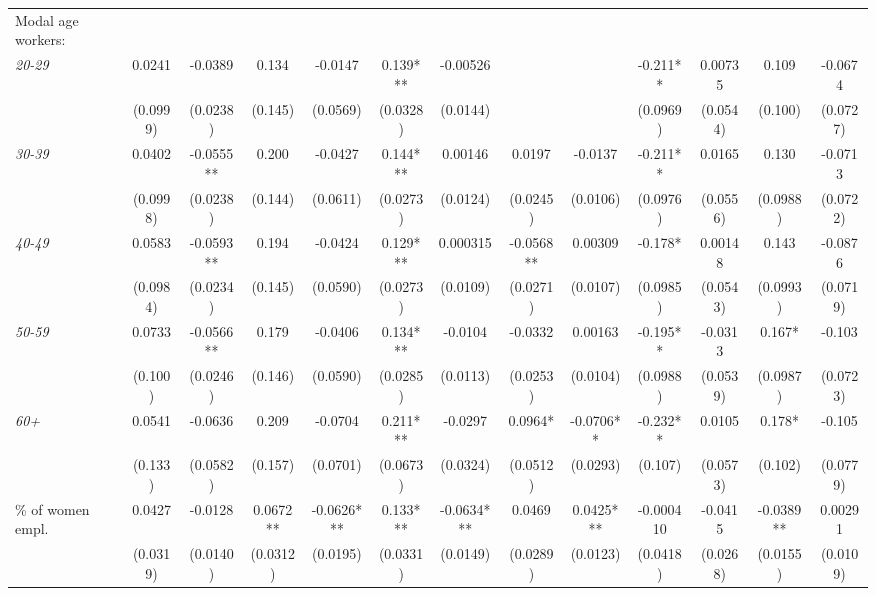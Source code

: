 \begin{threeparttable}
\begin{tabular}{l*{12}{S}}
Modal age workers:        \\[1ex]
\quad \textit{20-29}      &  0.0241    & -0.0389     & 0.134      & -0.0147    & 0.139***  & -0.00526   &            &            & -0.211**  & 0.00735   & 0.109       & -0.0674    \\
                          &  (0.0999)  & (0.0238)    & (0.145)    & (0.0569)   & (0.0328)  & (0.0144)   &            &            & (0.0969)  & (0.0544)  & (0.100)     & (0.0727)   \\[1ex]
\quad \textit{30-39}      &  0.0402    & -0.0555**   & 0.200      & -0.0427    & 0.144***  & 0.00146    & 0.0197     & -0.0137    & -0.211**  & 0.0165    & 0.130       & -0.0713    \\
                          &  (0.0998)  & (0.0238)    & (0.144)    & (0.0611)   & (0.0273)  & (0.0124)   & (0.0245)   & (0.0106)   & (0.0976)  & (0.0556)  & (0.0988)    & (0.0722)   \\[1ex]
\quad \textit{40-49}      &  0.0583    & -0.0593**   & 0.194      & -0.0424    & 0.129***  & 0.000315   & -0.0568**  & 0.00309    & -0.178*   & 0.00148   & 0.143       & -0.0876    \\
                          &  (0.0984)  & (0.0234)    & (0.145)    & (0.0590)   & (0.0273)  & (0.0109)   & (0.0271)   & (0.0107)   & (0.0985)  & (0.0543)  & (0.0993)    & (0.0719)   \\[1ex]
\quad \textit{50-59}      &  0.0733    & -0.0566**   & 0.179      & -0.0406    & 0.134***  & -0.0104    & -0.0332    & 0.00163    & -0.195**  & -0.0313   & 0.167*      & -0.103     \\
                          &  (0.100)   & (0.0246)    & (0.146)    & (0.0590)   & (0.0285)  & (0.0113)   & (0.0253)   & (0.0104)   & (0.0988)  & (0.0539)  & (0.0987)    & (0.0723)   \\[1ex]
\quad \textit{60+}        &  0.0541    & -0.0636     & 0.209      & -0.0704    & 0.211***  & -0.0297    & 0.0964*    & -0.0706**  & -0.232**  & 0.0105    & 0.178*      & -0.105     \\
                          &  (0.133)   & (0.0582)    & (0.157)    & (0.0701)   & (0.0673)  & (0.0324)   & (0.0512)   & (0.0293)   & (0.107)   & (0.0573)  & (0.102)     & (0.0779)   \\[1ex]
\% of women empl.         &  0.0427    & -0.0128     & 0.0672**   & -0.0626*** & 0.133***  & -0.0634*** & 0.0469     & 0.0425***  & -0.000410 & -0.0415   & -0.0389**   & 0.00291    \\
                          &  (0.0319)  & (0.0140)    & (0.0312)   & (0.0195)   & (0.0331)  & (0.0149)   & (0.0289)   & (0.0123)   & (0.0418)  & (0.0268)  & (0.0155)    & (0.0109)   \\[1ex]

\end{tabular}
\end{threeparttable}
